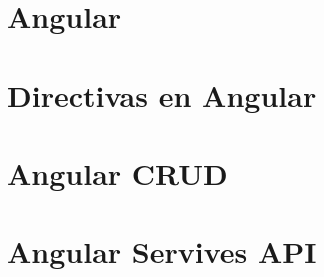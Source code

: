 \section{Angular}



\section{Directivas en Angular}


\section{Angular CRUD}


\section{Angular Servives API}
